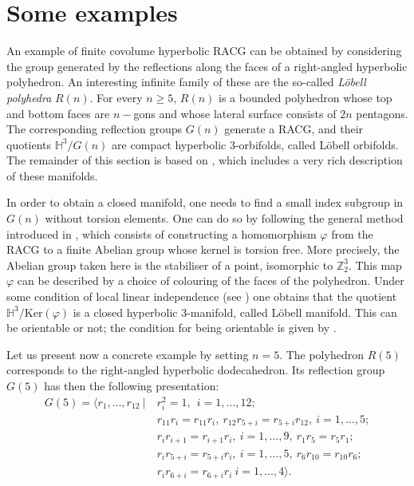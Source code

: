 \documentclass[12pt]{article}
\newcommand{\1}{\mathds{1}}
\begin{document}
\section{Some examples}
\label{sec: example}

An example of finite covolume hyperbolic RACG can be obtained by considering the group generated by the reflections along the faces of a right-angled hyperbolic polyhedron. An interesting infinite family of these are the so-called \textit{Löbell polyhedra} $R(n)$. For every $n\geq 5$, $R(n)$ is a bounded polyhedron whose top and bottom faces are $n-$gons and whose lateral surface consists of $2n$ pentagons.
The corresponding reflection groups $G(n)$ generate a RACG, and their quotients $\mathbb{H}^3 / G(n)$ are compact hyperbolic 3-orbifolds, called Löbell orbifolds. The remainder of this section is based on \cite{surveyVesnin}, which includes a very rich description of these manifolds.

In order to obtain a closed manifold, one needs to find a small index subgroup in $G(n)$ without torsion elements. One can do so by following the general method introduced in \cite{Vesnin}, which consists of constructing a homomorphism $\varphi$ from the RACG to a finite Abelian group whose kernel is torsion free. More precisely, the Abelian group taken here is the stabiliser of a point, isomorphic to $\mathbb{Z}_2^3$. This map $\varphi$ can be described by a choice of colouring of the faces of the polyhedron. Under some condition of local linear independence (see \cite[Lemma 1]{Vesnin}) one obtains that the quotient $\mathbb{H}^3 / \text{Ker}(\varphi)$ is a closed hyperbolic 3-manifold, called Löbell manifold. This can be orientable or not; the condition for being orientable is given by \cite[Lemma 2]{Vesnin}.

Let us present now a concrete example by setting $n=5$. The polyhedron $R(5)$ corresponds to the right-angled hyperbolic dodecahedron. Its reflection group $G(5)$ has then the following presentation:
\begin{align*}
    G(5) =  \langle r_1, \ldots, r_{12}\  | \ &r_i^2 =1, \ \ i=1,\ldots,12; \\
    &r_{11}r_i = r_{11}r_i, \ r_{12}r_{5+i}=r_{5+i}r_{12}, \ i=1,\ldots,5; \\
    &r_ir_{i+1} = r_{i+1}r_i, \  i=1,\ldots,9, \ r_1r_5=r_5r_1; \\
    &r_ir_{5+i}=r_{5+i}r_i, \ i=1,\ldots,5, \ r_6r_{10}=r_{10}r_6; \\
    &r_ir_{6+i}=r_{6+i}r_i \ i=1,\ldots,4\rangle.
\end{align*}
\end{document}
